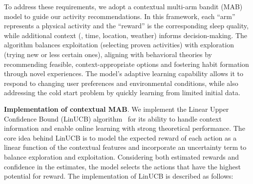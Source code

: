 To address these requirements, we adopt a contextual multi-arm bandit (MAB) model to guide our activity recommendations. In this framework, each ``arm'' represents a physical activity and the ``reward'' is the corresponding sleep quality, while additional context (\eg, time, location, weather) informs decision-making. 
The algorithm balances exploitation (selecting proven activities) with exploration (trying new or less certain ones), aligning with behavioral theories by recommending feasible, context-appropriate options and fostering habit formation through novel experiences. 
The model's adaptive learning capability allows it to respond to changing user preferences and environmental conditions, while also addressing the cold start problem by quickly learning from limited initial data.

\textbf{Implementation of contextual MAB}.
We implement the Linear Upper Confidence Bound (LinUCB) algorithm~\cite{li2010contextual}
for its ability to handle context information and enable online learning with strong theoretical performance.
The core idea behind LinUCB is to model the expected reward of each action as a linear function of the contextual features and incorporate an uncertainty term to balance exploration and exploitation. 
Considering both estimated rewards and confidence in the estimates, the model selects the actions that have the highest potential for reward.
The implementation of LinUCB is described as follows:
